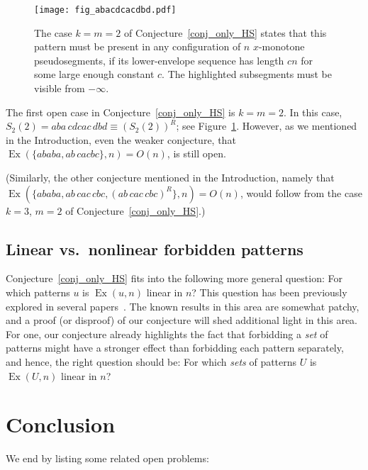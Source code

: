 \documentclass[11pt]{article}
\DeclareMathOperator{\Ex}{Ex}
\theoremstyle{definition}
\theoremstyle{remark}
\begin{document}
\begin{figure}
\centerline{\texttt{[image: fig\_abacdcacdbd.pdf]}}
\caption{\label{fig_abacdcacdbd} The case $k=m=2$ of Conjecture~\ref{conj_only_HS} states that this pattern must be present in any configuration of $n$ $x$-monotone pseudosegments, if its lower-envelope sequence has length $cn$ for some large enough constant $c$. The highlighted subsegments must be visible from $-\infty$.}
\end{figure}

The first open case in Conjecture~\ref{conj_only_HS} is $k=m=2$. In this case, $S_2(2) = aba\,cdcac\,dbd \equiv (S_2(2))^R$; see Figure~\ref{fig_abacdcacdbd}. However, as we mentioned in the Introduction, even the weaker conjecture, that $\Ex(\{ababa, ab\,cacbc\}, n)=O(n)$, is still open.

(Similarly, the other conjecture mentioned in the Introduction, namely that $\Ex(\{ababa,\allowbreak ab\,cac\,cbc,\allowbreak (ab\,cac\,cbc)^R\}, n)=O(n)$, would follow from the case $k=3$, $m=2$ of Conjecture~\ref{conj_only_HS}.)

\subsection{Linear vs.~nonlinear forbidden patterns}

Conjecture~\ref{conj_only_HS} fits into the following more general question: For which patterns $u$ is $\Ex(u,n)$ linear in $n$? This question has been previously explored in several papers~\cite{AKV,klazar_93,klazar_survey,pettie_forbid,pettie_origins}. The known results in this area are somewhat patchy, and a proof (or disproof) of our conjecture will shed additional light in this area. For one, our conjecture already highlights the fact that forbidding a \emph{set} of patterns might have a stronger effect than forbidding each pattern separately, and hence, the right question should be: For which \emph{sets} of patterns $U$ is $\Ex(U, n)$ linear in $n$?

\section{Conclusion}\label{sec_discussion}

We end by listing some related open problems:
\end{document}
